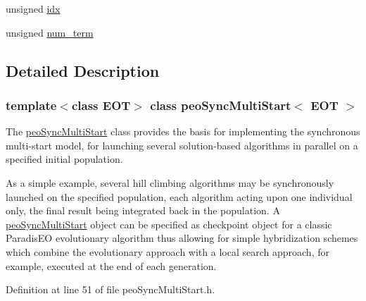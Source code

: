 \begin{CompactItemize}
\item 
\hypertarget{classpeoSyncMultiStart_64191ef79b7b589964ac9c3e23ae6718}{
unsigned \hyperlink{classpeoSyncMultiStart_64191ef79b7b589964ac9c3e23ae6718}{idx}}
\label{classpeoSyncMultiStart_64191ef79b7b589964ac9c3e23ae6718}

\item 
\hypertarget{classpeoSyncMultiStart_773eb9097550d9444f25ca8f48997a30}{
unsigned \hyperlink{classpeoSyncMultiStart_773eb9097550d9444f25ca8f48997a30}{num\_\-term}}
\label{classpeoSyncMultiStart_773eb9097550d9444f25ca8f48997a30}

\end{CompactItemize}


\subsection{Detailed Description}
\subsubsection*{template$<$class EOT$>$ class peo\-Sync\-Multi\-Start$<$ EOT $>$}

The \hyperlink{classpeoSyncMultiStart}{peo\-Sync\-Multi\-Start} class provides the basis for implementing the synchronous multi-start model, for launching several solution-based algorithms in parallel on a specified initial population. 

As a simple example, several hill climbing algorithms may be synchronously launched on the specified population, each algorithm acting upon one individual only, the final result being integrated back in the population. A \hyperlink{classpeoSyncMultiStart}{peo\-Sync\-Multi\-Start} object can be specified as checkpoint object for a classic Paradis\-EO evolutionary algorithm thus allowing for simple hybridization schemes which combine the evolutionary approach with a local search approach, for example, executed at the end of each generation. 



Definition at line 51 of file peo\-Sync\-Multi\-Start.h.

